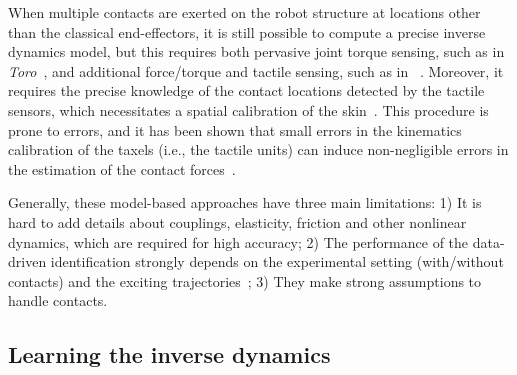 When multiple contacts are exerted on the robot structure at locations other than the classical end-effectors, it is still possible to compute a precise inverse dynamics model, but this requires both pervasive joint torque sensing, such as in \textit{Toro}~\cite{Ogawa2014}, and additional force/torque and tactile sensing, such as in \robot{}~\cite{Ivaldi2011}.
Moreover, it requires the precise knowledge of the contact locations detected by the tactile sensors, which necessitates a spatial calibration of the skin~\cite{DelPrete2011}. 
This procedure is prone to errors, and it has been shown that small errors in the kinematics calibration of the taxels (i.e., the tactile units) can induce non-negligible errors in the estimation of the contact forces~\cite{DelPrete2012}.

Generally, these model-based approaches have three main limitations: 1) It is hard to add details about couplings, elasticity, friction and other nonlinear dynamics, which are required for high accuracy; 2) The performance of the data-driven identification strongly depends on the experimental setting (with/without contacts) and the exciting trajectories~\cite{Pedrocchi2014}; 3) They make strong assumptions to handle contacts.


\subsection{Learning the inverse dynamics}

